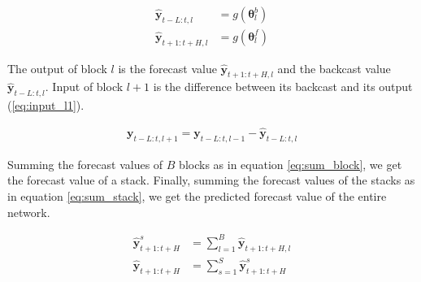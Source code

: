 \begin{align}
    \mathbf{\hat{y}}_{t-L:t, l} &= g\left(\mathbf{\theta}_l^b\right)\\
    \mathbf{\hat{y}}_{t+1:t+H, l} &= g\left(\mathbf{\theta}_l^f\right)
    \label{eq:interpolation}
\end{align}


The output of block $l$ is the forecast value $\mathbf{\hat{y}}_{t+1:t+H, l}$ and the backcast value $\mathbf{\hat{y}}_{ t-L:t, l}$. Input of block $l+1$ is the difference between its backcast and its output (\ref{eq:input_l1}).

\begin{align}
    \mathbf{y}_{t-L:t, l+1} = \mathbf{y}_{t-L:t, l-1} - \mathbf{\hat{y}}_{t-L:t, l}
    \label{eq:input_l1}
\end{align}


Summing the forecast values of $B$ blocks as in equation \ref{eq:sum_block}, we get the forecast value of a stack. Finally, summing the forecast values of the stacks as in equation \ref{eq:sum_stack}, we get the predicted forecast value of the entire network.

\begin{align}
    \mathbf{\hat{y}}_{t+1:t+H}^s &= \sum_{l=1}^{B}{\mathbf{\hat{y}}_{t+1:t+H, l}} \label{eq:sum_block}\\
    \mathbf{\hat{y}}_{t+1:t+H} &= \sum_{s=1}^{S}{\mathbf{\hat{y}}_{t+1:t+H}^s} \label{eq:sum_stack}
\end{align}


